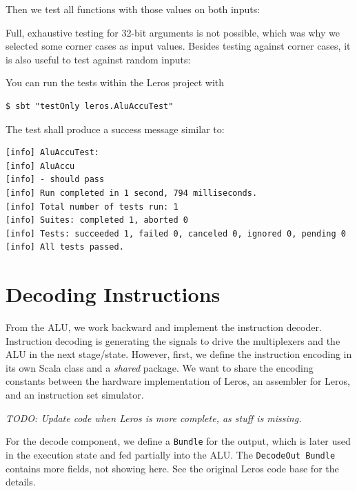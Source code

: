 \documentclass[%
    10pt,
    headinclude, footinclude=false,
    openright, %
    notitlepage,
    cleardoublepage=empty,
    headsepline,
    numbers=noenddot,
    bibliography=totoc, index=totoc,
    ]{scrbook}
\newcommand{\code}[1]{{\lstinline[basicstyle=\small\ttfamily]{#1}}}
\newcommand{\todo}[1]{{\emph{TODO: #1}}}
\begin{document}
\noindent Then we test all functions with those values on both inputs:


\noindent Full, exhaustive testing for 32-bit arguments is not possible, which was why we
selected some corner cases as input values. Besides testing against corner cases, it is also useful
to test against random inputs:


\noindent You can run the tests within the Leros project with

\begin{verbatim}
$ sbt "testOnly leros.AluAccuTest"
\end{verbatim}

The test shall produce a success message similar to:

\begin{verbatim}
[info] AluAccuTest:
[info] AluAccu
[info] - should pass
[info] Run completed in 1 second, 794 milliseconds.
[info] Total number of tests run: 1
[info] Suites: completed 1, aborted 0
[info] Tests: succeeded 1, failed 0, canceled 0, ignored 0, pending 0
[info] All tests passed.
\end{verbatim}

\section{Decoding Instructions}


From the ALU, we work backward and implement the instruction decoder.
Instruction decoding is generating the signals to drive the multiplexers
and the ALU in the next stage/state.
However, first, we define the instruction encoding in its own Scala class and
a \emph{shared} package. We want to share the encoding constants between
the hardware implementation of Leros, an assembler for Leros, and an instruction
set simulator.


\todo{Update code when Leros is more complete, as stuff is missing.}

\noindent For the decode component, we define a \code{Bundle} for the output,
which is later used in the execution state and fed partially into the ALU.
The \code{DecodeOut Bundle} contains more fields,
not showing here. See the original Leros code base for the details.
\end{document}
